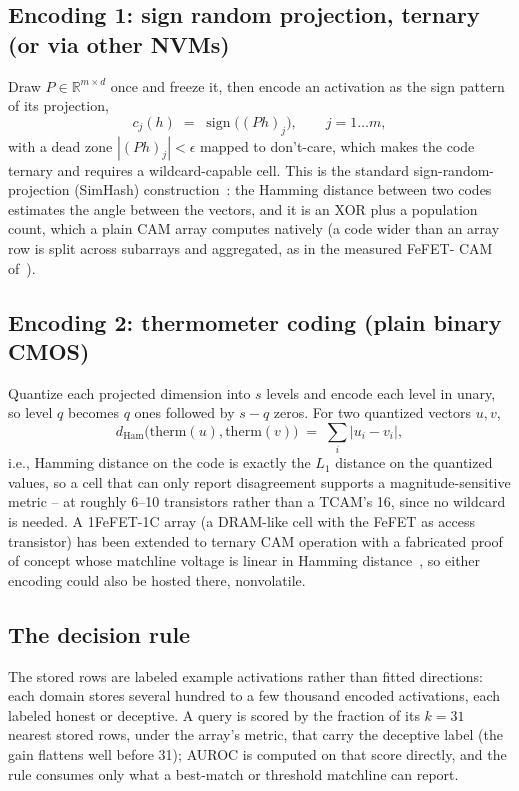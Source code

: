 \documentclass[conference]{IEEEtran}
\newcommand{\cam}{{CAM}\xspace}
\newcommand{\tcam}{{TCAM}\xspace}
\newcommand{\fefet}{{FeFET}\xspace}
\newcommand{\auroc}{{AUROC}\xspace}
\begin{document}
\subsection{Encoding 1: sign random projection, ternary (or via other
NVMs)}
\label{subsec:SignRP}
Draw $P \in \mathbb{R}^{m \times d}$ once and freeze it, then encode
an activation as the sign pattern of its projection,
%
\begin{equation}
c_j(h) \;=\; \operatorname{sign}\!\big( (Ph)_j \big), \qquad j = 1 \ldots m,
\label{eq:signrp}
\end{equation}
%
with a dead zone $|(Ph)_j| < \epsilon$ mapped to don't-care, which
makes the code ternary and requires a wildcard-capable cell. This is
the standard sign-random-projection (SimHash)
construction~\cite{charikar2002simhash}: the Hamming distance between
two codes estimates the angle between the vectors, and it is an XOR
plus a population count, which a plain \cam array computes natively
(a code wider than an array row is split across subarrays and
aggregated, as in the measured \fefet - \cam
of~\cite{kazemi2022hdcfefet}).

\subsection{Encoding 2: thermometer coding (plain binary CMOS)}
\label{subsec:Thermometer}
Quantize each projected dimension into $s$ levels and encode each
level in unary, so level $q$ becomes $q$ ones followed by $s-q$
zeros. For two quantized vectors $u,v$,
%
\begin{equation}
d_{\mathrm{Ham}}\big(\mathrm{therm}(u), \mathrm{therm}(v)\big)
\;=\; \sum_i \big| u_i - v_i \big|,
\label{eq:thermo}
\end{equation}
%
i.e., Hamming distance on the code is exactly the $L_1$ distance on
the quantized values, so a cell that can only report disagreement
supports a magnitude-sensitive metric -- at roughly 6--10 transistors
rather than a \tcam's 16, since no wildcard is needed. A
1\fefet-1C array (a DRAM-like cell with the \fefet as access
transistor) has been extended to ternary \cam operation with a
fabricated proof of concept whose matchline voltage is linear in
Hamming distance~\cite{fefet1c2026}, so either encoding could also be
hosted there, nonvolatile.

\subsection{The decision rule}
\label{subsec:Decision}
The stored rows are labeled example activations rather than fitted
directions: each domain stores several hundred to a few thousand
encoded activations, each labeled honest or deceptive. A query is
scored by the fraction
of its $k=31$ nearest stored rows, under the array's metric, that
carry the deceptive label (the gain flattens well before 31); \auroc
is computed on that score directly, and the rule consumes only what a
best-match or threshold matchline can report.
\end{document}
